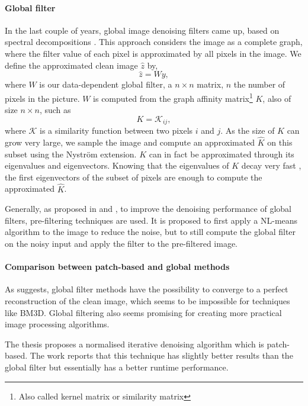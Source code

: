 \paragraph{Global filter}

In the last couple of years, global image denoising filters came up, based on spectral decompositions \cite{glide_2014}.
This approach considers the image as a complete graph, where the filter value of each pixel is approximated by all pixels in the image.
We define the approximated clean image \(\hat{z}\) by,
\[\hat{z} = Wy,\]
where \(W\) is our data-dependent global filter, a \(n \times n\) matrix, \(n\) the number of pixels in the picture.
\(W\) is computed from the graph affinity matrix\footnote{Also called kernel matrix or similarity matrix} \(K\), also of size \(n \times n\), such as
\[K = {\mathcal{K}_{ij}},\]
where \(\mathcal{K}\) is a similarity function between two pixels \(i\) and \(j\).
As the size of \(K\) can grow very large, we sample the image and compute an approximated \(\hat{K}\) on this subset using the Nystr\"om extension.
\(K\) can in fact be approximated through its eigenvalues and eigenvectors.
Knowing that the eigenvalues of \(K\) decay very fast \cite{siam_slides_2016}, the first eigenvectors of the subset of pixels are enough to compute the approximated \(\hat{K}\).

Generally, as proposed in \cite{glide_2014} and \cite{talebi_asymptotic_2016}, to improve the denoising performance of global filters, pre-filtering techniques are used.
It is proposed to first apply a NL-means algorithm to the image to reduce the noise, but to still compute the global filter on the noisy input and apply the filter to the pre-filtered image.

\paragraph{Comparison between patch-based and global methods}

As \cite{talebi_asymptotic_2016} suggests, global filter methods have the possibility to converge to a perfect reconstruction of the clean image, which seems to be impossible for techniques like BM3D.
Global filtering also seems promising for creating more practical image processing algorithms.

The thesis \cite{kheradmand_graph-based_2016} proposes a normalised iterative denoising algorithm which is patch-based.
The work reports that this technique has slightly better results than the global filter but essentially has a better runtime performance.

